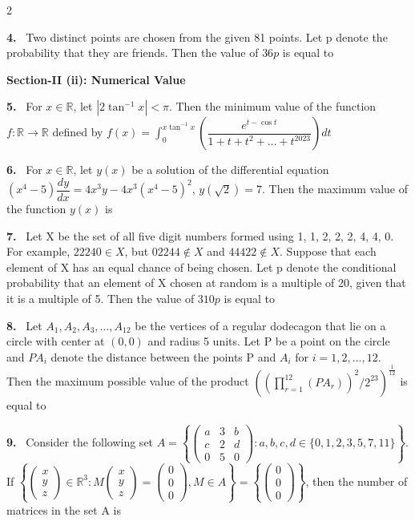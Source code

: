 \documentclass[10pt]{extarticle}
\newcommand{\sect}[1]{\par\smallskip\noindent\textbf{#1}\par}
\newcommand{\qn}[1]{\par\smallskip\noindent\textbf{#1.}~}
\begin{document}
\begin{multicols}{2}
\qn{4} Two distinct points are chosen from the given 81 points. Let p denote the probability that they are friends. Then the value of $36p$ is equal to

\sect{Section-II (ii): Numerical Value}

\qn{5} For $x\in\mathbb R$, let $|2\tan^{-1}x|<\pi$. Then the minimum value of the function $f:\mathbb R\to\mathbb R$ defined by $f(x)=\displaystyle\int_0^{x\tan^{-1}x}\left(\dfrac{e^{t-\cos t}}{1+t+t^2+\dots+t^{2023}}\right)dt$

\qn{6} For $x\in\mathbb R$, let $y(x)$ be a solution of the differential equation $(x^4-5)\dfrac{dy}{dx}=4x^3y-4x^3(x^4-5)^2$, $y(\sqrt2)=7$. Then the maximum value of the function $y(x)$ is

\qn{7} Let X be the set of all five digit numbers formed using 1, 1, 2, 2, 2, 4, 4, 0. For example, $22240\in X$, but $02244\notin X$ and $44422\notin X$. Suppose that each element of X has an equal chance of being chosen. Let p denote the conditional probability that an element of X chosen at random is a multiple of 20, given that it is a multiple of 5. Then the value of $310p$ is equal to

\qn{8} Let $A_1,A_2,A_3,\dots,A_{12}$ be the vertices of a regular dodecagon that lie on a circle with center at $(0,0)$ and radius 5 units. Let P be a point on the circle and $PA_i$ denote the distance between the points P and $A_i$ for $i=1,2,\dots,12$. Then the maximum possible value of the product $\left(\left(\displaystyle\prod_{r=1}^{12}(PA_r)\right)^2\Big/2^{23}\right)^{\frac{1}{12}}$ is equal to

\qn{9} Consider the following set $A=\left\{\begin{pmatrix}a&3&b\\c&2&d\\0&5&0\end{pmatrix}:a,b,c,d\in\{0,1,2,3,5,7,11\}\right\}$. If $\left\{\begin{pmatrix}x\\y\\z\end{pmatrix}\in\mathbb R^3: M\begin{pmatrix}x\\y\\z\end{pmatrix}=\begin{pmatrix}0\\0\\0\end{pmatrix},M\in A\right\}=\left\{\begin{pmatrix}0\\0\\0\end{pmatrix}\right\}$, then the number of matrices in the set A is


\end{multicols}
\end{document}
